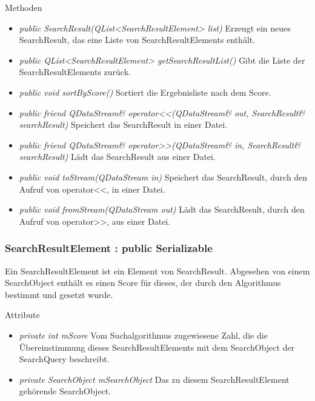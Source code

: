 Methoden
\begin{itemize}
\item \textit{public SearchResult(QList<SearchResultElement> list)} Erzeugt ein neues SearchResult, das eine Liste von SearchResultElements enthält.
\item \textit{public QList<SearchResultElement> getSearchResultList()} Gibt die Liste der SearchResultElements zurück.
\item \textit{public void sortByScore()} Sortiert die Ergebnisliste nach dem Score.
\item \textit{public friend QDataStream\& operator<<(QDataStream\& out, SearchResult\& searchResult)} Speichert das SearchResult in einer Datei.
\item \textit{public friend QDataStream\& operator>>(QDataStream\& in, SearchResult\& searchResult)} Lädt das SearchResult aus einer Datei.
\item \textit{public void toStream(QDataStream in)} Speichert das SearchResult, durch den Aufruf von operator<<, in einer Datei.
\item \textit{public void fromStream(QDataStream out)} Lädt das SearchResult, durch den Aufruf von operator>>, aus einer Datei.
\end{itemize}

\subsubsection*{SearchResultElement : public Serializable}
Ein SearchResultElement ist ein Element von SearchResult. Abgesehen von einem SearchObject enthält es einen Score für dieses, der durch den Algorithmus bestimmt und gesetzt wurde.

Attribute
\begin{itemize}
\item\textit{private int mScore} Vom Suchalgorithmus zugewiesene Zahl, die die Übereinstimmung dieses SearchResultElements mit dem SearchObject der SearchQuery beschreibt.
\item\textit{private SearchObject mSearchObject} Das zu diesem SearchResultElement gehörende SearchObject.
\end{itemize}

